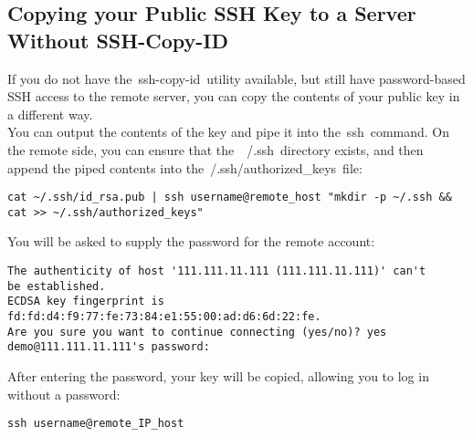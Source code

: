 \documentclass[12pt]{report}
\begin{document}
\subsection{Copying your Public SSH Key to a Server Without SSH-Copy-ID}
If you do not have the ssh-copy-id utility available, but still have password-based SSH access to the remote server, you can copy the contents of your public key in a different way.\\
You can output the contents of the key and pipe it into the ssh command. On the remote side, you can ensure that the ~/.ssh directory exists, and then append the piped contents into the~/.ssh/authorized\_keys file:
\begin{lstlisting} 
cat ~/.ssh/id_rsa.pub | ssh username@remote_host "mkdir -p ~/.ssh && 
cat >> ~/.ssh/authorized_keys"
\end{lstlisting} 
You will be asked to supply the password for the remote account:
\begin{lstlisting} 
The authenticity of host '111.111.11.111 (111.111.11.111)' can't 
be established.
ECDSA key fingerprint is fd:fd:d4:f9:77:fe:73:84:e1:55:00:ad:d6:6d:22:fe.
Are you sure you want to continue connecting (yes/no)? yes
demo@111.111.11.111's password:
\end{lstlisting} 
After entering the password, your key will be copied, allowing you to log in without a password:
\begin{lstlisting} 
ssh username@remote_IP_host
\end{lstlisting} 
\end{document}

